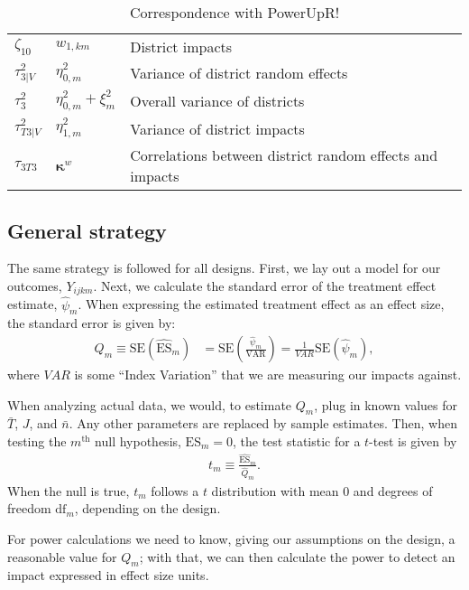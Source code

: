 \documentclass[12pt]{article}
\begin{document}
\begin{table}[p]
\begin{tabular}{l | l | l}
$\zeta_{10}$		& $w_{1,km}$					& District impacts\\
$\tau^2_{3|V}$		& $\eta^2_{0,m}$					& Variance of district random effects \\
$\tau^2_{3}$		& $\eta^2_{0,m} + \xi_{m}^2$		& Overall variance of districts\\
$\tau^2_{T3|V}$		& $\eta^2_{1,m}$					& Variance of district impacts\\
$\tau_{3T3}$		& $\boldsymbol{\kappa}^{w}$ 		& Correlations between district random effects and impacts \\
\end{tabular}
\caption{Correspondence with PowerUpR!\label{tab:powerup}}
\end{table}



\newpage
\subsection{General strategy}

The same strategy is followed for all designs.
First, we lay out a model for our outcomes, $Y_{ijkm}$.
Next, we calculate the standard error of the treatment effect estimate, $\hat{\psi}_m$.
When expressing the estimated treatment effect as an effect size, the standard error is given by:
\begin{align}\label{eqn:qm}
Q_m \equiv \text{SE}\left(\hat{\text{ES}}_m\right) &= \text{SE}\left(\frac{\hat{\psi}_m}{\mbox{VAR}}\right) = \frac{1}{VAR} \text{SE}\left(\hat{\psi}_m\right),
\end{align}
where $VAR$ is some ``Index Variation'' that we are measuring our impacts against.

When analyzing actual data, we would, to estimate $Q_m$, plug in known values for $\bar{T}$, $J$, and $\bar{n}$.
Any other parameters are replaced by sample estimates.
Then, when testing the $m^{\text{th}}$ null hypothesis, $\text{ES}_m = 0$, the test statistic for a $t$-test is given by
\begin{align}t_m \equiv \frac{\hat{\text{ES}}_m}{\hat{Q}_m}.\end{align}
When the null is true, $t_m$ follows a $t$ distribution with mean $0$ and degrees of freedom $\text{df}_m$, depending on the design.

For power calculations we need to know, giving our assumptions on the design, a reasonable value for $Q_m$; with that, we can then calculate the power to detect an impact expressed in effect size units.
\end{document}
